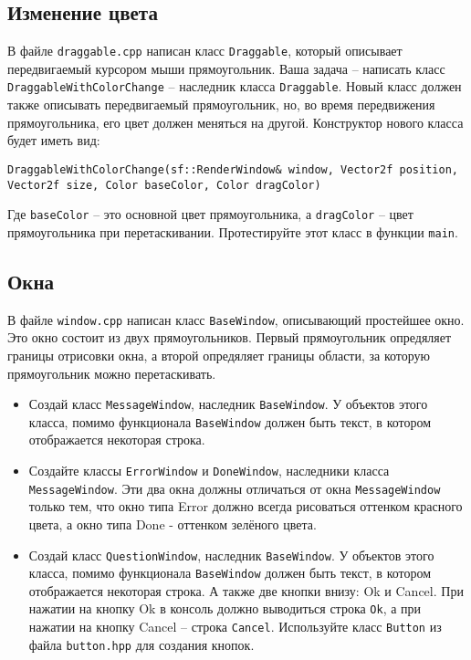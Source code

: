 \documentclass{article}
\begin{document}
\subsection{Изменение цвета}
В файле \texttt{draggable.cpp} написан класс \texttt{Draggable}, который описывает передвигаемый курсором мыши прямоугольник. Ваша задача -- написать класс \texttt{DraggableWithColorChange} -- наследник класса \texttt{Draggable}. Новый класс должен также описывать передвигаемый прямоугольник, но, во время передвижения прямоугольника, его цвет должен меняться на другой. Конструктор нового класса будет иметь вид:
\begin{lstlisting}
DraggableWithColorChange(sf::RenderWindow& window, Vector2f position, Vector2f size, Color baseColor, Color dragColor) 
\end{lstlisting}
Где \texttt{baseColor} -- это основной цвет прямоугольника, а \texttt{dragColor} -- цвет прямоугольника при перетаскивании.
Протестируйте этот класс в функции \texttt{main}.




\subsection{Окна}
В файле \texttt{window.cpp} написан класс \texttt{BaseWindow}, описывающий простейшее окно. Это окно состоит из двух прямоугольников. Первый прямоугольник опредяляет границы отрисовки окна, а второй опредяляет границы области, за которую прямоугольник можно перетаскивать.

\begin{itemize}

\item Создай класс \texttt{MessageWindow}, наследник \texttt{BaseWindow}.
У объектов этого класса, помимо функционала \texttt{BaseWindow} должен быть текст, в котором отображается некоторая строка. 

\item Создайте классы \texttt{ErrorWindow} и \texttt{DoneWindow}, наследники класса \texttt{MessageWindow}. Эти два окна должны отличаться от окна \texttt{MessageWindow} только тем, что окно типа Error должно всегда рисоваться оттенком красного цвета, а окно типа Done - оттенком зелёного цвета.

\item Создай класс \texttt{QuestionWindow}, наследник \texttt{BaseWindow}.
У объектов этого класса, помимо функционала \texttt{BaseWindow} должен быть текст, в котором отображается некоторая строка. А также две кнопки внизу: Ok и Cancel. При нажатии на кнопку Ok в консоль должно выводиться строка \texttt{Ok}, а при нажатии на кнопку Cancel -- строка \texttt{Cancel}. Используйте класс \texttt{Button} из файла \texttt{button.hpp} для создания кнопок.

\end{itemize}


        
\end{document}
